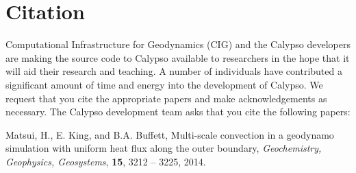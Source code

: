 \section{Citation}
\label{section:citation}

Computational Infrastructure for Geodynamics (CIG) and the Calypso developers are making the source code to Calypso available to researchers in the hope that it will aid their research and teaching. A number of individuals have contributed a significant amount of time and energy into the development of Calypso. We request that you cite the appropriate papers and make acknowledgements as necessary. The Calypso development team asks that you cite the following papers:

Matsui, H., E. King, and B.A. Buffett, Multi-scale convection in a geodynamo simulation with uniform heat flux along the outer boundary, {\it Geochemistry, Geophysics, Geosystems}, {\bf 15}, 3212 -- 3225, 2014.